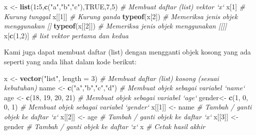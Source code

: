 \documentclass[
]{book}
\newenvironment{Shaded}{\begin{snugshade}}{\end{snugshade}}
\newcommand{\CommentTok}[1]{\textcolor[rgb]{0.56,0.35,0.01}{\textit{#1}}}
\newcommand{\DataTypeTok}[1]{\textcolor[rgb]{0.13,0.29,0.53}{#1}}
\newcommand{\DecValTok}[1]{\textcolor[rgb]{0.00,0.00,0.81}{#1}}
\newcommand{\KeywordTok}[1]{\textcolor[rgb]{0.13,0.29,0.53}{\textbf{#1}}}
\newcommand{\NormalTok}[1]{#1}
\newcommand{\OperatorTok}[1]{\textcolor[rgb]{0.81,0.36,0.00}{\textbf{#1}}}
\newcommand{\OtherTok}[1]{\textcolor[rgb]{0.56,0.35,0.01}{#1}}
\newcommand{\StringTok}[1]{\textcolor[rgb]{0.31,0.60,0.02}{#1}}
\begin{document}
\begin{Shaded}
\begin{Highlighting}[]
\NormalTok{x <-}\StringTok{ }\KeywordTok{list}\NormalTok{(}\DecValTok{1}\OperatorTok{:}\DecValTok{5}\NormalTok{,}\KeywordTok{c}\NormalTok{(}\StringTok{"a"}\NormalTok{,}\StringTok{"b"}\NormalTok{,}\StringTok{"c"}\NormalTok{),}\OtherTok{TRUE}\NormalTok{,}\DecValTok{7}\NormalTok{,}\DecValTok{5}\NormalTok{)  }\CommentTok{# Membuat daftar (list) vektor `x`}
\NormalTok{x[}\DecValTok{1}\NormalTok{]                                    }\CommentTok{# Kurung tunggal}
\NormalTok{x[[}\DecValTok{1}\NormalTok{]]                                  }\CommentTok{# Kurung ganda}
\KeywordTok{typeof}\NormalTok{(x[}\DecValTok{2}\NormalTok{])                            }\CommentTok{# Memeriksa jenis objek menggunakan []}
\KeywordTok{typeof}\NormalTok{(x[[}\DecValTok{2}\NormalTok{]])                          }\CommentTok{# Memeriksa jenis objek menggunakan [[]]}
\NormalTok{x[}\KeywordTok{c}\NormalTok{(}\DecValTok{1}\NormalTok{,}\DecValTok{2}\NormalTok{)]                               }\CommentTok{# list vektor pertama dan kedua}
\end{Highlighting}
\end{Shaded}

Kami juga dapat membuat daftar (list) dengan mengganti objek kosong yang ada seperti yang anda lihat dalam kode berikut:

\begin{Shaded}
\begin{Highlighting}[]
\NormalTok{x <-}\StringTok{ }\KeywordTok{vector}\NormalTok{(}\StringTok{"list"}\NormalTok{, }\DataTypeTok{length =} \DecValTok{3}\NormalTok{)         }\CommentTok{# Membuat daftar (list) kosong (sesuai kebutuhan)}
\NormalTok{name <-}\StringTok{ }\KeywordTok{c}\NormalTok{(}\StringTok{"a"}\NormalTok{,}\StringTok{"b"}\NormalTok{,}\StringTok{"c"}\NormalTok{,}\StringTok{"d"}\NormalTok{)              }\CommentTok{# Membuat objek sebagai variabel `name`}
\NormalTok{age  <-}\StringTok{ }\KeywordTok{c}\NormalTok{(}\DecValTok{18}\NormalTok{, }\DecValTok{19}\NormalTok{, }\DecValTok{20}\NormalTok{, }\DecValTok{21}\NormalTok{)               }\CommentTok{# Membuat objek sebagai variabel `age`}
\NormalTok{gender<-}\StringTok{ }\KeywordTok{c}\NormalTok{(}\DecValTok{1}\NormalTok{, }\DecValTok{0}\NormalTok{, }\DecValTok{0}\NormalTok{, }\DecValTok{1}\NormalTok{)                  }\CommentTok{# Membuat objek sebagai variabel `gender`}
\NormalTok{x[[}\DecValTok{1}\NormalTok{]] <-}\StringTok{ }\NormalTok{name                          }\CommentTok{# Tambah / ganti objek ke daftar `x`}
\NormalTok{x[[}\DecValTok{2}\NormalTok{]] <-}\StringTok{ }\NormalTok{age                           }\CommentTok{# Tambah / ganti objek ke daftar `x`}
\NormalTok{x[[}\DecValTok{3}\NormalTok{]] <-}\StringTok{ }\NormalTok{gender                        }\CommentTok{# Tambah / ganti objek ke daftar `x`}
\NormalTok{x                                       }\CommentTok{# Cetak hasil akhir}
\end{Highlighting}
\end{Shaded}
\end{document}
